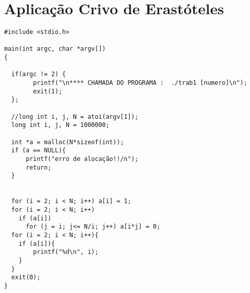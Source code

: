 \chapter{Aplicação Crivo de Erastóteles}
\label{anexo:crivo}

\begin{scriptsize}
\begin{verbatim}
#include <stdio.h>

main(int argc, char *argv[])
{

  if(argc != 2) {
        printf("\n**** CHAMADA DO PROGRAMA :  ./trab1 [numero]\n");
        exit(1);
  };

  //long int i, j, N = atoi(argv[1]);
  long int i, j, N = 1000000;

  int *a = malloc(N*sizeof(int));
  if (a == NULL){
      printf("erro de alocação!!/n");
      return;
  }


  for (i = 2; i < N; i++) a[i] = 1;
  for (i = 2; i < N; i++)
    if (a[i])
      for (j = i; j<= N/i; j++) a[i*j] = 0;
  for (i = 2; i < N; i++){
    if (a[i]){
        printf("%d\n", i);
    }
  }
  exit(0);
}
\end{verbatim}
\end{scriptsize}

